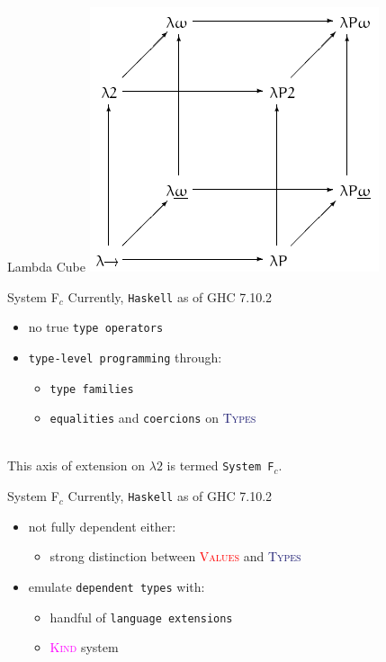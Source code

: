 \documentclass[xcolor={usenames,dvipsnames}]{beamer}
\newcommand{\htycon}[1]{\textcolor{MidnightBlue}{\textsc{#1}}}
\newcommand{\hvalcon}[1]{\textcolor{Red}{\textsc{#1}}}
\newcommand{\hkind}[1]{\textcolor{Fuchsia}{\textsc{#1}}}
\begin{document}
\begin{frame}[fragile]{Lambda Cube}
  \includegraphics[scale=0.6]{Lambda_cube.png}
\end{frame}

\begin{frame}[fragile]{System F$_c$}
  Currently, \texttt{Haskell} as of GHC 7.10.2
  \begin{itemize}
    \item no true \texttt{type operators}
    \item \texttt{type-level programming} through:
      \begin{itemize}
        \item \texttt{type families}
        \item \texttt{equalities} and \texttt{coercions} on \htycon{Types}
      \end{itemize}
  \end{itemize}

  \ \\
  This axis of extension on $\lambda2$ is termed \texttt{System F$_c$}.
\end{frame}

\begin{frame}[fragile]{System F$_c$}
  Currently, \texttt{Haskell} as of GHC 7.10.2
  \begin{itemize}
    \item not fully dependent either:
      \begin{itemize}
        \item strong distinction between \hvalcon{Values} and \htycon{Types}
      \end{itemize}
    \item emulate \texttt{dependent types} with:
      \begin{itemize}
        \item handful of \texttt{language extensions}
        \item \hkind{Kind} system
      \end{itemize}
  \end{itemize}
\end{frame}
\end{document}
